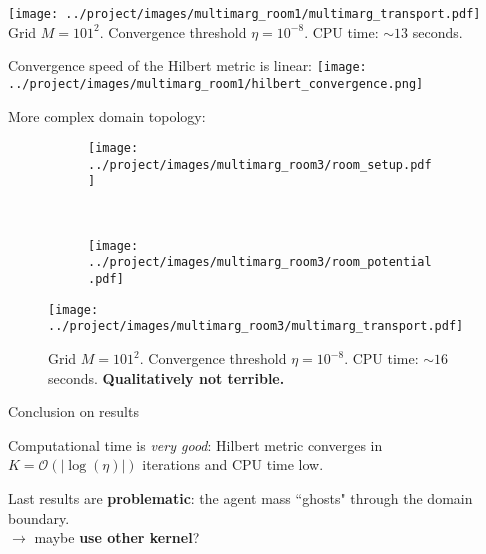 \documentclass[xcolor={dvipsnames}]{beamer}
\newcommand{\calO}{\mathcal{O}}
\newcommand{\redfont}{\color{darkred}}
\newcommand{\greenfont}{\color{Green!90!black}}
\begin{document}
\begin{frame}
	
	\texttt{[image: ../project/images/multimarg\_room1/multimarg\_transport.pdf]}
	Grid $M=101^2$. Convergence threshold $\eta = 10^{-8}$. CPU time: $\sim 13$ seconds.
\end{frame}

\begin{frame}
	Convergence speed of the Hilbert metric is linear:
	\texttt{[image: ../project/images/multimarg\_room1/hilbert\_convergence.png]}
\end{frame}

\begin{frame}
	
	More complex domain topology:
	
	\begin{figure}
		\begin{subfigure}{.45\linewidth}
			\texttt{[image: ../project/images/multimarg\_room3/room\_setup.pdf]}
		\end{subfigure}~
		\begin{subfigure}{.49\linewidth}
			\texttt{[image: ../project/images/multimarg\_room3/room\_potential.pdf]}
		\end{subfigure}
	\end{figure}
	
\end{frame}


\begin{frame}
	\begin{figure}
	\texttt{[image: ../project/images/multimarg\_room3/multimarg\_transport.pdf]}
	\caption{Grid $M=101^2$. Convergence threshold $\eta = 10^{-8}$. CPU time: $\sim 16$ seconds.
	{\bfseries\redfont Qualitatively not terrible.}}	
	\end{figure}
\end{frame}

\begin{frame}{Conclusion on results}
	
	Computational time is \textit{\greenfont very good}: Hilbert metric converges in $K = \calO(|{\log(\eta)}|)$ iterations and CPU time low.
	
	Last results are \textbf{problematic}: the agent mass ``ghosts" through the domain boundary.\\
	$\rightarrow$ maybe \textbf{use other kernel}?
	
\end{frame}
\end{document}
